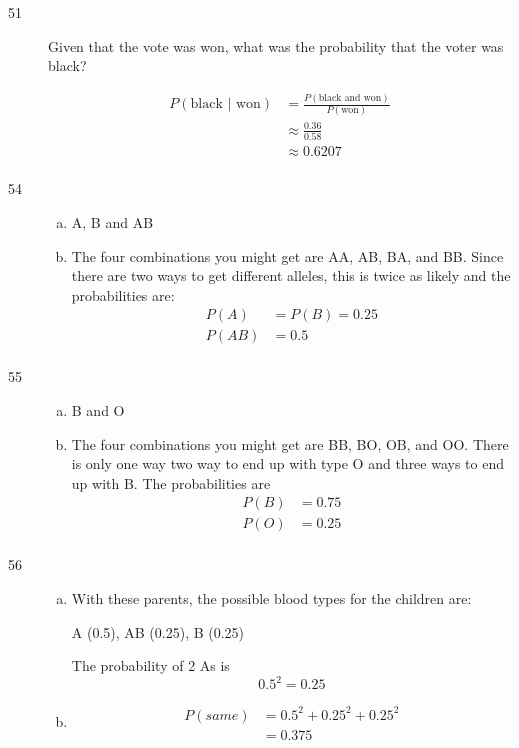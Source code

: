 \documentclass[letterpaper, landscape]{exam}
\begin{document}
\begin{description}
    \item[51]
      Given that the vote was won, what was the probability that the voter was black?

      \begin{align*}
        P(\text{black } | \text{ won}) & = \frac{P(\text{black and won})}{P(\text{won})} \\
                       & \approx \frac{0.36}{0.58} \\
                       & \approx \boxed{ 0.6207 } \\
      \end{align*}

    \item[54]
      \begin{enumerate}[(a)]
        \item A, B and AB

        \item
          The four combinations you might get are AA, AB, BA, and BB\@. Since there are 
          two ways to get different alleles, this is twice as likely and the probabilities
          are:
          \begin{align*}
            P(A)  & = P(B) = 0.25 \\
            P(AB) & = 0.5 \\
          \end{align*}
      \end{enumerate}

    \item[55]
      \begin{enumerate}[(a)]
        \item B and O

        \item
          The four combinations you might get are BB, BO, OB, and OO\@. There is
          only one way two way to end up with type O and three ways to end up
          with B. The probabilities are
          \begin{align*}
            P(B) & = 0.75 \\
            P(O) & = 0.25 \\
          \end{align*}
      \end{enumerate}

    \item[56]
      \begin{enumerate}[(a)]
        \item 
          With these parents, the possible blood types for the children are: 
          
          A (0.5), AB (0.25), B (0.25)

          The probability of 2 As is 
          \[
            0.5^2 = \boxed{ 0.25 }
          \]

        \item 
          \begin{align*}
            P(same) & = 0.5^2 + 0.25^2 + 0.25^2 \\
                    & = \boxed{ 0.375 }
          \end{align*}
      \end{enumerate}
  \end{description}
\end{document}
